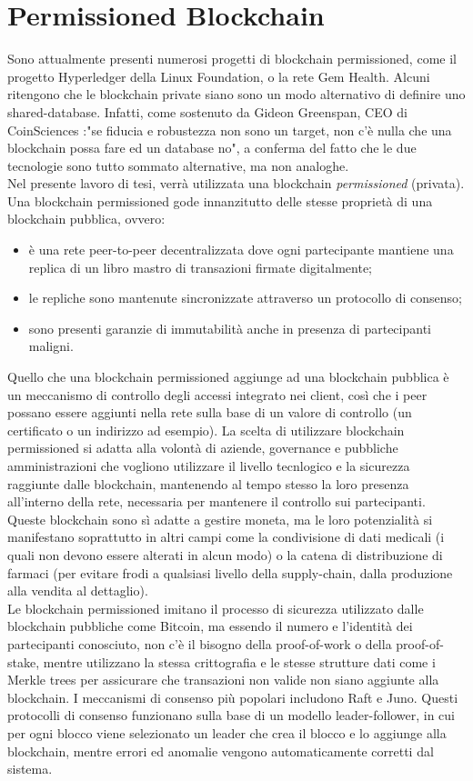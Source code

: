 \section{Permissioned Blockchain}
%
Sono attualmente presenti numerosi progetti di blockchain permissioned, come il progetto Hyperledger\cite{website:hyperledger} della Linux Foundation, o la rete Gem Health\cite{gem}. Alcuni ritengono che le blockchain private siano sono un modo alternativo di definire uno shared-database. Infatti, come sostenuto da Gideon Greenspan, CEO di CoinSciences :"se fiducia e robustezza non sono un target, non c'è nulla che una blockchain possa fare ed un database no", a conferma del fatto che le due tecnologie sono tutto sommato alternative, ma non analoghe.\\
Nel presente lavoro di tesi, verrà utilizzata una blockchain \emph{permissioned} (privata). Una blockchain permissioned gode innanzitutto delle stesse proprietà di una blockchain pubblica, ovvero:
\begin{itemize}
	\item è una rete peer-to-peer decentralizzata dove ogni partecipante mantiene una replica di un libro mastro di transazioni firmate digitalmente;
	\item le repliche sono mantenute sincronizzate attraverso un protocollo di consenso;
	\item sono presenti garanzie di immutabilità anche in presenza di partecipanti maligni.
\end{itemize}
Quello che una blockchain permissioned aggiunge ad una blockchain pubblica è un meccanismo di controllo degli accessi integrato nei client, così che i peer possano essere aggiunti nella rete sulla base di un valore di controllo (un certificato o un indirizzo ad esempio). La scelta di utilizzare blockchain permissioned si adatta alla volontà di aziende, governance e pubbliche amministrazioni che vogliono utilizzare il livello tecnlogico e la sicurezza raggiunte dalle blockchain, mantenendo al tempo stesso la loro presenza all'interno della rete, necessaria per mantenere il controllo sui partecipanti. Queste blockchain sono sì adatte a gestire moneta, ma le loro potenzialità si manifestano soprattutto in altri campi come la condivisione di dati medicali (i quali non devono essere alterati in alcun modo) o la catena di distribuzione di farmaci (per evitare frodi a qualsiasi livello della supply-chain, dalla produzione alla vendita al dettaglio). \\
Le blockchain permissioned imitano il processo di sicurezza utilizzato dalle blockchain pubbliche come Bitcoin, ma essendo il numero e l'identità dei partecipanti conosciuto, non c'è il bisogno della proof-of-work o della proof-of-stake, mentre utilizzano la stessa crittografia e le stesse strutture dati come i Merkle trees\cite{merkle} per assicurare che transazioni non valide non siano aggiunte alla blockchain. I meccanismi di consenso più popolari includono Raft\cite{raft} e Juno\cite{juno}. Questi protocolli di consenso funzionano sulla base di un modello leader-follower, in cui per ogni blocco viene selezionato un leader che crea il blocco e lo aggiunge alla blockchain, mentre errori ed anomalie vengono automaticamente corretti dal sistema. \\
